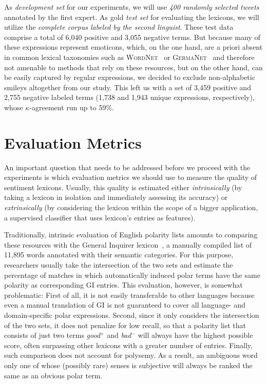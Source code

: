 As \emph{development set} for our experiments, we will use \emph{400
  randomly selected tweets} annotated by the first expert.  As gold
\emph{test set} for evaluating the lexicons, we will utilize the
\emph{complete corpus labeled by the second linguist}.  These test
data comprise a total of 6,040 positive and 3,055 negative terms.  But
because many of these expressions represent emoticons, which, on the
one hand, are a priori absent in common lexical taxonomies such as
\textsc{WordNet}~\cite{Miller:95,Miller:07} or
\textsc{GermaNet}~\cite{Hamp:97} and therefore not amenable to methods
that rely on these resources, but on the other hand, can be easily
captured by regular expressions, we decided to exclude non-alphabetic
smileys altogether from our study.  This left us with a set of 3,459
positive and 2,755 negative labeled terms (1,738 and 1,943 unique
expressions, respectively), whose $\kappa$-agreement run up to 59\%.

\section{Evaluation Metrics}\label{sec:snt-lex:eval-metrics}

An important question that needs to be addressed before we proceed
with the experiments is which evaluation metrics we should use to
measure the quality of sentiment lexicons.  Usually, this quality is
estimated either \textit{intrinsically} (by taking a lexicon in
isolation and immediately assessing its accuracy) or
\textit{extrinsically} (by considering the lexicon within the scope of
a bigger application, \eg{} a supervised classifier that uses
lexicon's entries as features).

Traditionally, intrinsic evaluation of English polarity lists amounts
to comparing these resources with the General Inquirer
lexicon~\cite[GI; ][]{Stone:66}, a manually compiled list of 11,895
words annotated with their semantic categories.  For this purpose,
researchers usually take the intersection of the two sets and estimate
the percentage of matches in which automatically induced polar terms
have the same polarity as corresponding GI entries.  This evaluation,
however, is somewhat problematic: First of all, it is not easily
transferable to other languages because even a manual translation of
GI is not guaranteed to cover all language- and domain-specific polar
expressions.  Second, since it only considers the intersection of the
two sets, it does not penalize for low recall, so that a polarity list
that consists of just two terms \textit{good}$^+$ and \textit{bad}$^-$
will always have the highest possible score, often surpassing other
lexicons with a greater number of entries.  Finally, such comparison
does not account for polysemy.  As a result, an ambiguous word only
one of whose (possibly rare) senses is subjective will always be
ranked the same as an obvious polar term.

